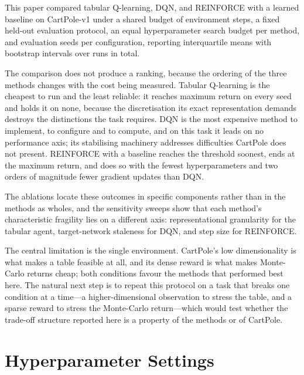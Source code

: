 \documentclass[conference]{IEEEtran}
\begin{document}
This paper compared tabular Q-learning, DQN, and REINFORCE with a learned
baseline on CartPole-v1 under a shared budget of \StepBudget{} environment steps,
a fixed held-out evaluation protocol, an equal hyperparameter search budget per
method, and \NumSeeds{} evaluation seeds per configuration, reporting
interquartile means with bootstrap intervals over \NumRunsTotal{} runs in total.

The comparison does not produce a ranking, because the ordering of the three
methods changes with the cost being measured. Tabular Q-learning is the cheapest
to run and the least reliable: it reaches maximum return on every seed and holds
it on none, because the discretisation its exact representation demands destroys
the distinctions the task requires. DQN is the most expensive method to implement,
to configure and to compute, and on this task it leads on no performance axis;
its stabilising machinery addresses difficulties CartPole does not present.
REINFORCE with a baseline reaches the threshold soonest, ends at the maximum
return, and does so with the fewest hyperparameters and two orders of magnitude
fewer gradient updates than DQN.

The ablations locate these outcomes in specific components rather than in the
methods as wholes, and the sensitivity sweeps show that each method's
characteristic fragility lies on a different axis: representational granularity
for the tabular agent, target-network staleness for DQN, and step size for
REINFORCE.

The central limitation is the single environment. CartPole's low dimensionality
is what makes a table feasible at all, and its dense reward is what makes
Monte-Carlo returns cheap; both conditions favour the methods that performed best
here. The natural next step is to repeat this protocol on a task that breaks one
condition at a time---a higher-dimensional observation to stress the table, and a
sparse reward to stress the Monte-Carlo return---which would test whether the
trade-off structure reported here is a property of the methods or of CartPole.




\appendices
\section{Hyperparameter Settings}

\end{document}
